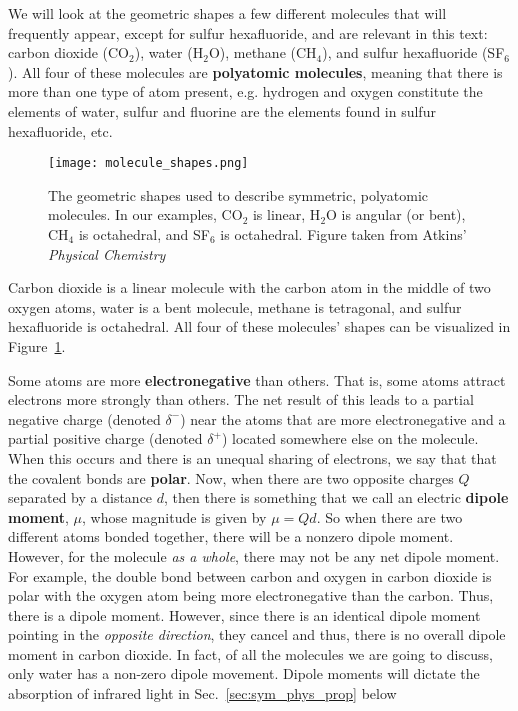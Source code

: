     We will look at the geometric shapes a few different molecules that will frequently appear, except for sulfur hexafluoride, and are relevant in this text: carbon dioxide (CO$_2$), water (H$_2$O), methane (CH$_4$), and sulfur hexafluoride (SF$_6$). All four of these molecules are \textbf{polyatomic molecules}, meaning that there is more than one type of atom present, e.g. hydrogen and oxygen constitute the elements of water, sulfur and fluorine are the elements found in sulfur hexafluoride, etc. 

    \begin{figure}[ht]
        \centering
        \texttt{[image: molecule\_shapes.png]}
        \caption{The geometric shapes used to describe symmetric, polyatomic molecules. In our examples, CO$_2$ is linear, H$_2$O is angular (or bent), CH$_4$ is octahedral, and SF$_6$ is octahedral. Figure taken from Atkins' \emph{Physical Chemistry} \citep{atkins2014physical}}
        \label{fig:shapes}
    \end{figure}

    Carbon dioxide is a linear molecule with the carbon atom in the middle of two oxygen atoms, water is a bent molecule, methane is tetragonal, and sulfur hexafluoride is octahedral. All four of these molecules' shapes can be visualized in Figure~\ref{fig:shapes}.

    Some atoms are more \textbf{electronegative} than others. That is, some atoms attract electrons more strongly than others. The net result of this leads to a partial negative charge (denoted $\delta^-$) near the atoms that are more electronegative and a partial positive charge (denoted $\delta^+$) located somewhere else on the molecule. When this occurs and there is an unequal sharing of electrons, we say that that the covalent bonds are \textbf{polar}. Now, when there are two opposite charges $Q$ separated by a distance $d$, then there is something that we call an electric \textbf{dipole moment}, $\mu$, whose magnitude is given by \( \mu = Q d. \) So when there are two different atoms bonded together, there will be a nonzero dipole moment. However, for the molecule \emph{as a whole}, there may not be any net dipole moment. For example, the double bond between carbon and oxygen in carbon dioxide is polar with the oxygen atom being more electronegative than the carbon. Thus, there is a dipole moment. However, since there is an identical dipole moment pointing in the \emph{opposite direction}, they cancel and thus, there is no overall dipole moment in carbon dioxide. In fact, of all the molecules we are going to discuss, only water has a non-zero dipole movement. Dipole moments will dictate the absorption of infrared light in Sec.~\ref{sec:sym_phys_prop} below \citep{atkins2014physical,harris1978symmetry,bishop1993group}

